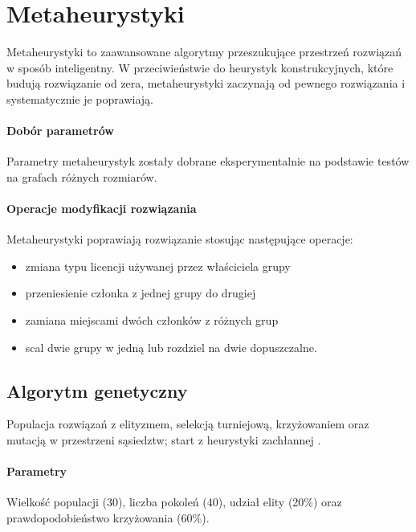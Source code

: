 \section{Metaheurystyki}

Metaheurystyki to zaawansowane algorytmy przeszukujące przestrzeń rozwiązań w sposób inteligentny. W przeciwieństwie do heurystyk konstrukcyjnych, które budują rozwiązanie od zera, metaheurystyki zaczynają od pewnego rozwiązania i systematycznie je poprawiają.

\paragraph{Dobór parametrów}
Parametry metaheurystyk zostały dobrane eksperymentalnie na podstawie testów na grafach różnych rozmiarów.

\paragraph{Operacje modyfikacji rozwiązania}
Metaheurystyki poprawiają rozwiązanie stosując następujące operacje:
\begin{itemize}
  \item zmiana typu licencji używanej przez właściciela grupy
  \item przeniesienie członka z jednej grupy do drugiej
  \item zamiana miejscami dwóch członków z różnych grup
  \item scal dwie grupy w jedną lub rozdziel na dwie dopuszczalne.
\end{itemize}

\subsection{Algorytm genetyczny}\label{subsec:ga}
Populacja rozwiązań z elityzmem, selekcją turniejową, krzyżowaniem oraz mutacją w przestrzeni sąsiedztw; start z heurystyki zachłannej \cite{holland1975,goldberg1989}.

\paragraph{Parametry}
Wielkość populacji (30), liczba pokoleń (40), udział elity (20\%) oraz prawdopodobieństwo krzyżowania (60\%).


